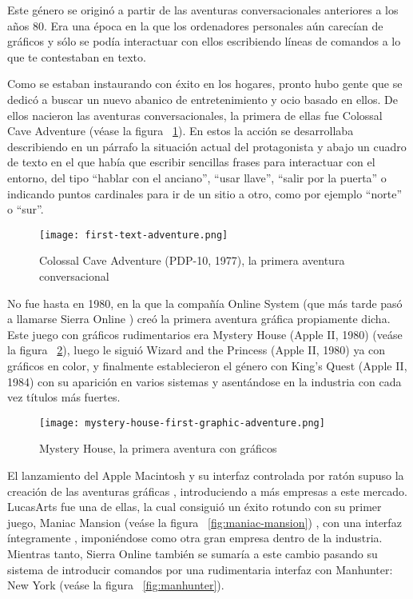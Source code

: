 Este género se originó a partir de las aventuras conversacionales anteriores a los años 80. Era una época en la que los ordenadores personales aún carecían de gráficos y sólo se podía interactuar con ellos escribiendo líneas de comandos a lo que te contestaban en texto. 

Como se estaban instaurando con éxito en los hogares, pronto hubo gente que se dedicó a buscar un nuevo abanico de entretenimiento y ocio basado en ellos. De ellos nacieron las aventuras conversacionales, la primera de ellas fue Colossal Cave Adventure  (véase la figura ~\ref{fig:text-adventure}). En estos la acción se desarrollaba describiendo en un párrafo la situación actual del protagonista y abajo un cuadro de texto en el que había que escribir sencillas frases para interactuar con el entorno, del tipo ``hablar con el anciano'', ``usar llave'', ``salir por la puerta'' o indicando puntos cardinales para ir de un sitio a otro, como por ejemplo ``norte'' o ``sur''.

\begin{figure}[H] 
  \begin{center}
    \texttt{[image: first-text-adventure.png]}
  \end{center}
  \caption{Colossal Cave Adventure (PDP-10, 1977), la primera aventura conversacional}
    \label{fig:text-adventure}
\end{figure}

No fue hasta en 1980, en la que la compañía Online System (que más tarde pasó a llamarse Sierra Online ) creó la primera aventura gráfica propiamente dicha. Este juego con gráficos rudimentarios era Mystery House  (Apple II, 1980) (veáse la figura ~\ref{fig:mystery-house}), luego le siguió Wizard and the Princess  (Apple II, 1980) ya con gráficos en color, y finalmente establecieron el género con King's Quest  (Apple II, 1984) con su aparición en varios sistemas y asentándose en la industria con cada vez títulos más fuertes.

\begin{figure}[H] 
  \begin{center}
    \texttt{[image: mystery-house-first-graphic-adventure.png]}
  \end{center}
  \caption{Mystery House, la primera aventura con gráficos}
  \label{fig:mystery-house}
\end{figure}

El lanzamiento del Apple Macintosh y su interfaz controlada por ratón supuso la creación de las aventuras gráficas , introduciendo a más empresas a este mercado. LucasArts  fue una de ellas, la cual consiguió un éxito rotundo con su primer juego, Maniac Mansion (veáse la figura ~\ref{fig:maniac-mansion}) , con una interfaz íntegramente , imponiéndose como otra gran empresa dentro de la industria. Mientras tanto, Sierra Online también se sumaría a este cambio pasando su sistema de introducir comandos por una rudimentaria interfaz  con Manhunter: New York  (veáse la figura ~\ref{fig:manhunter}).

